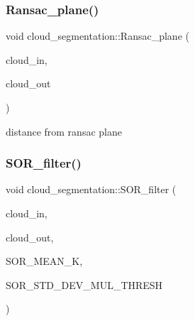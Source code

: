 \mbox{\label{classdatmo_1_1cloud__segmentation_a168514d0652e6ada8a371604470b98ed}} 
\subsubsection{\texorpdfstring{Ransac\+\_\+plane()}{Ransac\_plane()}}
{\footnotesize\ttfamily void cloud\+\_\+segmentation\+::\+Ransac\+\_\+plane (\begin{DoxyParamCaption}\item[{const pcl\+::\+Point\+Cloud$<$ pcl\+::\+Point\+X\+YZ $>$\+::Ptr \&}]{cloud\+\_\+in,  }\item[{const pcl\+::\+Point\+Cloud$<$ pcl\+::\+Point\+X\+YZ $>$\+::Ptr \&}]{cloud\+\_\+out }\end{DoxyParamCaption})\hspace{0.3cm}{\ttfamily [private]}}

distance from ransac plane \mbox{\label{classdatmo_1_1cloud__segmentation_a169ebef33c020301b83261ee2d3f49df}} 
\subsubsection{\texorpdfstring{S\+O\+R\+\_\+filter()}{SOR\_filter()}}
{\footnotesize\ttfamily void cloud\+\_\+segmentation\+::\+S\+O\+R\+\_\+filter (\begin{DoxyParamCaption}\item[{const pcl\+::\+Point\+Cloud$<$ pcl\+::\+Point\+X\+YZ $>$\+::Ptr \&}]{cloud\+\_\+in,  }\item[{const pcl\+::\+Point\+Cloud$<$ pcl\+::\+Point\+X\+YZ $>$\+::Ptr \&}]{cloud\+\_\+out,  }\item[{float}]{S\+O\+R\+\_\+\+M\+E\+A\+N\+\_\+K,  }\item[{float}]{S\+O\+R\+\_\+\+S\+T\+D\+\_\+\+D\+E\+V\+\_\+\+M\+U\+L\+\_\+\+T\+H\+R\+E\+SH }\end{DoxyParamCaption})\hspace{0.3cm}{\ttfamily [private]}}


